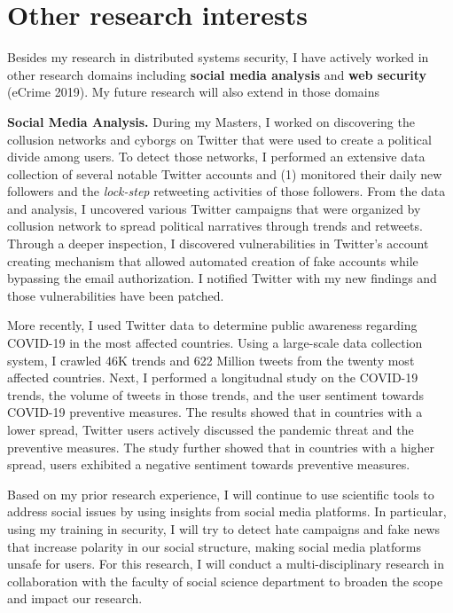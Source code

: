 \documentclass{NSF}
\newcommand{\BfPara}[1]{{\noindent\textbf{#1.}}\xspace}
\begin{document}
\section{Other research interests} \vspace{-1mm}
Besides my research in distributed systems security, I have actively worked in other research domains including \textbf{social media analysis} and \textbf{web security} (eCrime 2019). My future research will also extend in those domains 


\BfPara{Social Media Analysis} During my Masters, I worked on discovering the collusion networks and cyborgs on Twitter that were used to create a political divide among users. To detect those networks, I performed an extensive data collection of several notable Twitter accounts and (1) monitored their daily new followers and the {\em lock-step} retweeting activities of those followers. From the data and analysis, I uncovered various Twitter campaigns that were organized by collusion network to spread political narratives through trends and retweets. Through a deeper inspection, I discovered vulnerabilities in Twitter's account creating mechanism that allowed automated creation of fake accounts while bypassing the email authorization. I notified Twitter with my new findings and those vulnerabilities have been patched.  

More recently, I used Twitter data to determine public awareness regarding COVID-19 in the most affected countries. Using a large-scale data collection system, I crawled 46K trends and 622 Million tweets from the twenty most affected countries. Next, I performed a longitudnal study on the COVID-19 trends, the volume of tweets in those trends, and the user sentiment towards COVID-19 preventive measures. The results showed that in countries with a lower spread, Twitter users actively discussed the pandemic threat and the preventive measures. The study further showed that in countries with a higher spread, users exhibited a negative sentiment towards preventive measures. 

Based on my prior research experience, I will continue to use scientific tools to address social issues by using insights from social media platforms. In particular, using my training in security, I will try to detect hate campaigns and fake news that increase polarity in our social structure, making social media platforms unsafe for users. For this research, I will conduct a multi-disciplinary research in collaboration with the faculty of social science department to broaden the scope and impact our research.  
\end{document}
